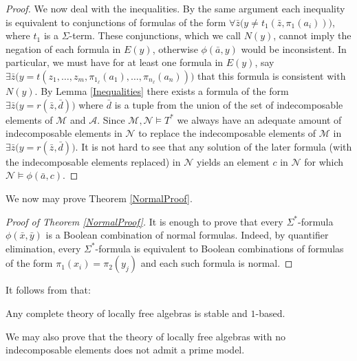 \documentclass[a4paper,11pt]{article}
\begin{document}
\begin{proof}
We now deal with the inequalities. By the same argument each inequality is equivalent to conjunctions of formulas of the form $\forall \bar z \big(y\neq t_1(\bar z, \pi_1(a_i))\big)$, where $t_1$ is a $\Sigma$-term. These conjunctions, which we call $N(y)$, cannot imply the negation of each formula in $E(y)$, otherwise $\phi(\bar a, y)$ would be inconsistent. In particular, we must have for at least one formula in $E(y)$, say $\exists \bar z \big(y=t(z_1, \ldots, z_m, \pi_{1_\ell}(a_1), \ldots,\pi_{n_\ell}(a_n))\big)$ that this formula is consistent with $N(y)$. By Lemma \ref{Inequalities} there exists a formula of the form $\exists \bar z \big(y=r(\bar z, \bar d)\big)$ where $\bar d$ is a tuple from the union of the set of indecomposable elements of $\mathcal{M}$ and $\mathcal{A}$. Since $\mathcal{M}, \mathcal{N}\models T^*$ we always have an adequate amount of indecomposable elements in $\mathcal{N}$ to replace the indecomposable elements of $\mathcal{M}$ in $\exists \bar z \big(y=r(\bar z, \bar d)\big)$. It is not hard to see that any solution of the later formula (with the indecomposable elements replaced) in $\mathcal{N}$ yields an element $c$ in $\mathcal{N}$ for which $\mathcal{N}\models \phi(\bar a, c)$.
\end{proof}

We now may prove Theorem \ref{NormalProof}. 
\begin{proof}[Proof of Theorem \ref{NormalProof}]
It is enough to prove that every $\Sigma^*$-formula $\phi(\bar x, \bar y)$ is a Boolean combination of normal formulas. Indeed, by quantifier elimination, every $\Sigma^*$-formula is equivalent to Boolean combinations of formulas of the form $\pi_1(x_i)=\pi_2(y_j)$ and each such formula is normal.
\end{proof}

It follows from \cite{HrushovskiPillay1987WeaklyNormal} that:

\begin{corollary}
Any complete theory of locally free algebras is stable and $1$-based.
\end{corollary}


We may also prove that the theory of locally free algebras with no indecomposable elements does not admit a prime model. 
\end{document}
